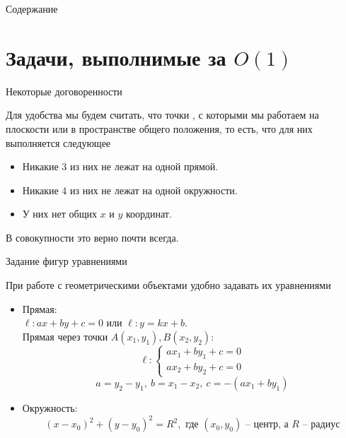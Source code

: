 \documentclass[12pt,aspectratio=169,svgnames]{beamer}
\begin{document}
 \maketitle

\begin{frame}{Содержание}
	\tableofcontents
\end{frame}

\section{Задачи, выполнимые за $O(1)$}
\begin{frame}{Некоторые договоренности}

	Для удобства мы будем считать, что точки , с которыми мы работаем на плоскости или в пространстве
	\alert{общего положения}, то есть, что для них выполняется следующее

	\begin{itemize}
		\item Никакие 3 из них не лежат на одной прямой.

		\item Никакие 4 из них не лежат на одной окружности.

		\item У них нет общих $x$ и $y$ координат.
	\end{itemize}

	В совокупности это верно почти всегда.

\end{frame}

\begin{frame}{Задание фигур уравнениями}

	При работе с геометрическими объектами удобно задавать их уравнениями

		\begin{itemize}
			\item Прямая:\\

			$\ell\colon ax + by + c = 0$ или $\ell\colon y = kx + b$.\\
			Прямая через точки $A(x_1, y_1), B(x_2, y_2)$:
			\[ \ell\colon \begin{cases} ax_1 + by_1 + c = 0 \\ ax_2 + by_2 + c = 0 \end{cases}\]
			\[ a = y_2 - y_1, \ b = x_1 - x_2, \ c = -(ax_1 + by_1)\]

			\item Окружность:
			\[ (x - x_0)^2 + (y - y_0)^2 = R^2, \text{ где } (x_0, y_0) \text{ -- центр, а } R \text{ -- радиус} \]
		\end{itemize}

\end{frame}
\end{document}
